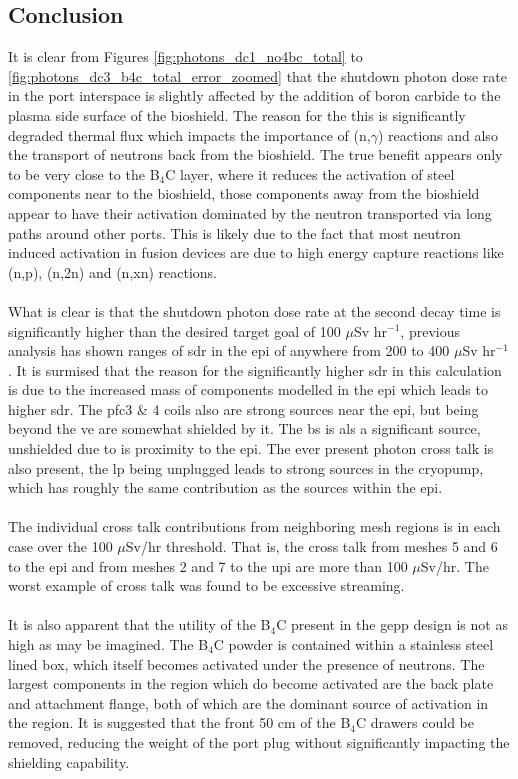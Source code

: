 \documentclass[12pt]{article}
\begin{document}
\subsection{Conclusion}
It is clear from Figures \ref{fig:photons_dc1_no4bc_total} to 
\ref{fig:photons_dc3_b4c_total_error_zoomed} that the shutdown photon dose rate 
in the port interspace is slightly affected by the addition of boron carbide 
to the plasma side surface of the bioshield. The reason for the this is 
significantly degraded thermal flux which impacts the importance of (n,$\gamma$)
 reactions and also the transport of neutrons back from the bioshield. The true 
benefit appears only to be very close to the B$_4$C layer, where it reduces the
activation of steel components near to the bioshield, those components away
from the bioshield appear to have their activation dominated by the neutron
transported via long paths around other ports. This is  likely due to the fact
that most neutron induced activation in fusion devices are due to high energy
capture reactions like (n,p), (n,2n) and (n,xn) reactions.
\\
\\
What is clear is that the shutdown photon dose rate at the second decay time is
significantly higher than the desired target goal of 100 $\mu$Sv hr$^{-1}$,
previous analysis has shown ranges of \gls{sdr} in the \gls{epi} of anywhere
from 200 to 400 $\mu$Sv hr$^{-1}$. It is surmised that the reason for the
significantly higher \gls{sdr} in this calculation is due to the increased
mass of components modelled in the \gls{epi} which leads to higher \gls{sdr}.
The \gls{pfc}3 \& 4 coils also are strong sources near the \gls{epi}, but being
beyond the \gls{ve} are somewhat shielded by it. The \gls{bs} is als a
significant source, unshielded due to is proximity to the \gls{epi}. The ever
present photon cross talk is also present, the \gls{lp} being unplugged leads
to strong sources in the cryopump, which has roughly the same contribution
as the sources within the \gls{epi}.
\\
\\
The individual cross talk contributions from neighboring mesh regions is in each 
case over the 100 $\mu$Sv/hr threshold.  That is, the cross talk from meshes 5 and 6
to the \gls{epi} and from meshes 2 and 7 to the \gls{upi} are more than 100 $\mu$Sv/hr.
The worst example of cross talk was found to be excessive streaming.
\\
\\
It is also apparent that the utility of the B$_4$C present in the \gls{gepp}
design is not as high as may be imagined. The B$_4$C powder is contained within
a stainless steel lined box, which itself becomes activated under the presence
of neutrons. The largest components in the region which do become activated are
the back plate and attachment flange, both of which are the dominant source of
activation in the region. It is suggested that the front 50 cm of the B$_4$C
drawers could be removed, reducing the weight of the port plug without
significantly impacting the shielding capability.
\end{document}
